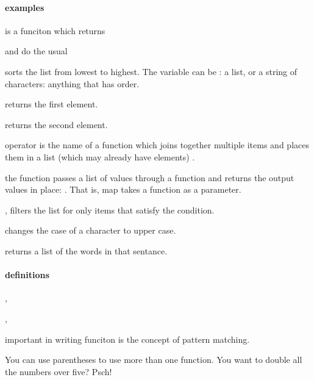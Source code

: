 \paragraph{examples}
\begin{compactitem}
\item {} is a funciton which returns 
\item {} and  do the usual
\item {} sorts the list from lowest to highest. The variable can be \e{$[a_1,a_2,a_3,...]$}: a list, or a string of characters: anything that has order.
\item {} returns the first element.
\item {} returns the second element.
\item {} operator \e{:} is the name of a function which joins together multiple items and places them in a list (which may already have elements) . 
\item the  function passes a list of values through a function and returns the output values in place: . That is, map takes a function as a parameter.
\item {}, filters the list for only items that satisfy the condition.
\item {} changes the case of a character to upper case.
\item {} returns a list of the words in that sentance.
\end{compactitem}

\paragraph{definitions}
\begin{compactitem}
\item {},
\item {},
\item important in writing funciton is the concept of pattern matching.
\item You can use parentheses to use more than one function. You want to double all the numbers over five? Psch! 
\end{compactitem}

